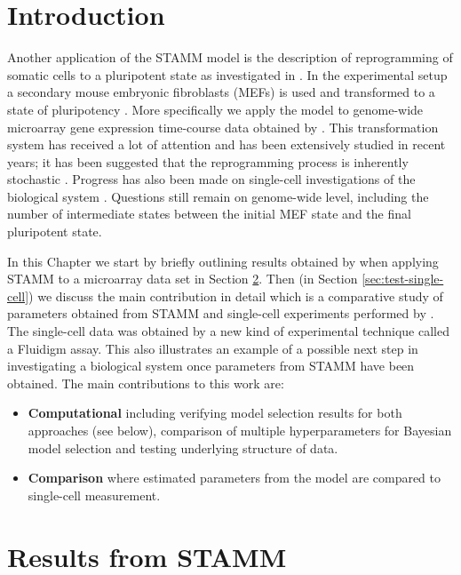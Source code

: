 
\section{Introduction}
\label{sec:introduction-rep}

Another application of the STAMM model is the description of reprogramming of somatic cells to a pluripotent state as investigated in \cite{Armond:2013}. In the experimental setup a secondary mouse embryonic fibroblasts (MEFs) is used and transformed to a state of pluripotency \citep{Takahashi:2006hi,Jaenisch:2008cz}. More specifically we apply the model to genome-wide microarray gene expression time-course data obtained by \cite{SamavarchiTehrani:2010cp}. This transformation system has received a lot of attention and has been extensively studied in recent years; it has been suggested that the reprogramming process is inherently stochastic \citep{Hanna:2009ix}. Progress has also been made on single-cell investigations of the biological system \citep{Buganim:2012hp}. Questions still remain on genome-wide level, including the number of intermediate states between the initial MEF state and the final pluripotent state.

In this Chapter we start by briefly outlining results obtained by \cite{Armond:2013} when applying STAMM to a microarray data set in Section \ref{sec:iPsc-results}. Then (in Section \ref{sec:test-single-cell}) we discuss the main contribution in detail which is a comparative study of parameters obtained from STAMM and single-cell experiments performed by \cite{Buganim:2012hp}. The single-cell data was obtained by a new kind of experimental technique called a Fluidigm assay. This also illustrates an example of a possible next step in investigating a biological system once parameters from STAMM have been obtained. The main contributions to this work are:

\begin{itemize}
\item {\bf Computational} including verifying model selection results for both approaches (see below), comparison of multiple hyperparameters for Bayesian model selection and testing underlying structure of data.
\item {\bf Comparison} where estimated parameters from the model are compared to single-cell measurement.
\end{itemize}

\section{Results from STAMM}
\label{sec:iPsc-results}

